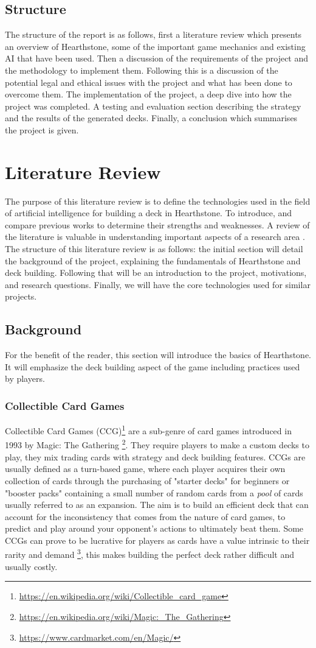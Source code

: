 \documentclass{report} %
\begin{document}
\section{Structure}
The structure of the report is as follows, first a literature review which presents an overview of Hearthstone, some of the important game mechanics and existing AI that have been used. Then a discussion  of  the  requirements  of  the  project  and  the  methodology  to implement them. Following this is a discussion of the potential legal and ethical issues with the project and what has been done to overcome them. The implementation of the project, a deep dive into how the project was completed. A testing and evaluation section describing the strategy and the results of the generated decks. Finally, a conclusion which summarises the project is given.

\chapter{Literature Review}
The purpose of this literature review is to define the technologies used in the field of artificial intelligence for building a deck in Hearthstone. To introduce, and compare previous works to determine their strengths and weaknesses. A review of the literature is valuable in understanding important aspects of a research area \cite{Isaacs2020}. The structure of this literature review is as follows: the initial section will detail the background of the project, explaining the fundamentals of Hearthstone and deck building. Following that will be an introduction to the project,  motivations, and research questions. Finally, we will have the core technologies used for similar projects.
\section{Background}
	For the benefit of the reader, this section will introduce the basics of Hearthstone. It will emphasize the deck building aspect of the game including practices used by players.  
\subsection{Collectible Card Games}
	Collectible Card Games (CCG)\footnote{\url{https://en.wikipedia.org/wiki/Collectible_card_game}} are a sub-genre of card games introduced in 1993 by Magic: The Gathering \footnote{\url{https://en.wikipedia.org/wiki/Magic:_The_Gathering}}. They require players to make a custom decks to play, they mix trading cards with strategy and deck building features. CCGs are usually defined as a turn-based game, where each player acquires their own collection of cards through the purchasing of "starter decks" for beginners or "booster packs" containing a small number of random cards from a {\it{pool}} of cards usually referred to as an expansion. The aim is to build an efficient deck that can account for the inconsistency that comes from the nature of card games, to predict and play around your opponent's actions to ultimately beat them. Some CCGs can prove to be lucrative for players as cards have a value intrinsic to their rarity and demand \footnote{\url{https://www.cardmarket.com/en/Magic/}}, this makes building the perfect deck rather difficult and usually costly.
\end{document}
